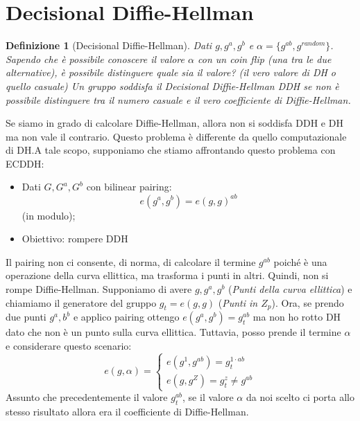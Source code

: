 \documentclass{book}
\newtheorem{Definizione}{\textbf{Definizione}}
\begin{document}
\section{Decisional Diffie-Hellman}
\begin{Definizione}[Decisional Diffie-Hellman]
	Dati \(g,g^{a},g^{b}\) e \(\alpha = \{g^{ab},g^{random}\} \). Sapendo che è possibile conoscere il valore \(\alpha \) con un coin flip (una tra le due alternative), è possibile distinguere quale sia il valore? (il vero valore di DH o quello casuale)\newline
	Un gruppo soddisfa il Decisional Diffie-Hellman DDH se non è possibile distinguere tra il numero casuale e il vero coefficiente di Diffie-Hellman.
\end{Definizione}
Se siamo in grado di calcolare Diffie-Hellman, allora non si soddisfa DDH e DH ma non vale il contrario.\newline
Questo problema è differente da quello computazionale di DH.A tale scopo, supponiamo che stiamo affrontando questo problema con ECDDH:\begin{itemize}
	\item Dati \(G,G^{a},G^{b}\) con bilinear pairing:\begin{equation*}
		e(g^{a},g^{b})={e(g,g)}^{ab}
	\end{equation*} (in modulo);
	\item Obiettivo: rompere DDH
\end{itemize}
Il pairing non ci consente, di norma, di calcolare il termine \(g^{ab}\) poiché è una operazione della curva ellittica, ma trasforma i punti in altri. Quindi, non si rompe Diffie-Hellman\@.\newline
Supponiamo di avere \(g,g^{a},g^{b}\) (\emph{Punti della curva ellittica}) e chiamiamo il generatore del gruppo \(g_{t}={e(g,g)}\) (\emph{Punti in \(Z_{p}\)}). Ora, se prendo due punti \(g^{a},b^{b}\) e applico pairing ottengo \(e(g^{a},g^{b})=g_{t}^{ab}\) ma non ho rotto DH dato che non è un punto sulla curva ellittica. Tuttavia, posso prende il termine \(\alpha \) e considerare questo scenario:\begin{equation*}
	e(g,\alpha )=\begin{cases}
		e(g^{1},g^{ab})=g_{t}^{1\cdot ab}\\
		e(g,g^{Z})=g_{t}^{z}\neq g^{ab}
	\end{cases}
\end{equation*}
Assunto che precedentemente il valore \(g_{t}^{ab}\), se il valore \(\alpha \) da noi scelto ci porta allo stesso risultato allora era il coefficiente di Diffie-Hellman.
\end{document}
